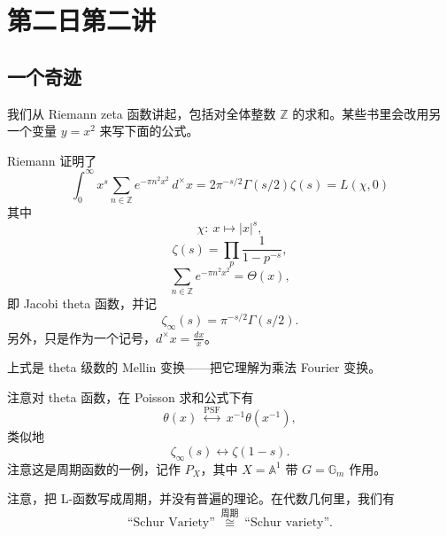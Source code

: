 \section{第二日第二讲}

\subsection{一个奇迹}

我们从 Riemann zeta 函数讲起，包括对全体整数 $\mathbb Z$ 的求和。某些书里会改用另一个变量 $y=x^2$ 来写下面的公式。

Riemann 证明了
\begin{equation}
  \int_0^\infty x^s\sum_{n\in\mathbb Z}e^{-\pi n^2x^2}\,d^\times x=2\pi^{-s/2}\Gamma(s/2)\zeta(s)=L(\chi,0)
  \label{eq:5-1}
\end{equation}
其中
\begin{equation}
  \chi:\ x\mapsto|x|^s,
  \label{eq:5-2}
\end{equation}
\begin{equation}
  \zeta(s)=\prod_p\frac{1}{1-p^{-s}},
  \label{eq:5-3}
\end{equation}
\begin{equation}
  \sum_{n\in\mathbb Z}e^{-\pi n^2x^2}=\Theta(x),
  \label{eq:5-4}
\end{equation}
即 Jacobi theta 函数，并记
\begin{equation}
  \zeta_\infty(s)=\pi^{-s/2}\Gamma(s/2).
  \label{eq:5-5}
\end{equation}
另外，只是作为一个记号，$d^\times x=\frac{dx}{x}$。

上式是 theta 级数的 Mellin 变换——把它理解为乘法 Fourier 变换。

注意对 theta 函数，在 Poisson 求和公式下有
\begin{equation}
  \theta(x)\ \overset{\text{PSF}}{\longleftrightarrow}\ x^{-1}\theta(x^{-1}),
  \label{eq:5-6}
\end{equation}
类似地
\begin{equation}
  \zeta_\infty(s)\longleftrightarrow\zeta(1-s).
  \label{eq:5-7}
\end{equation}
注意这是周期函数的一例，记作 $P_X$，其中 $X=\mathbb A^1$ 带 $G=\mathbb G_m$ 作用。

注意，把 L-函数写成周期，并没有普遍的理论。在代数几何里，我们有
\begin{equation}
  \text{``Schur Variety''}\ \overset{\text{周期}}{\cong}\ \text{``Schur variety''}.
  \label{eq:5-8}
\end{equation}

